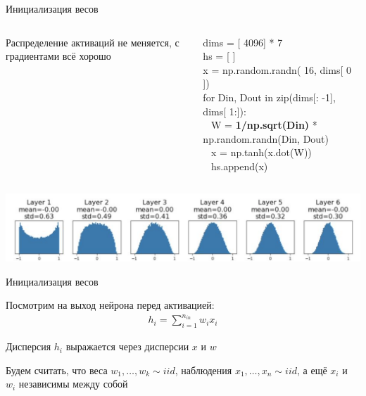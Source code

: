 \documentclass[notes,12pt, aspectratio=169]{beamer}
\newenvironment{wideitemize}{\itemize\addtolength{\itemsep}{10pt}}{\enditemize}
\begin{document}
\begin{frame}{Инициализация весов}
\begin{columns}
	\begin{column}{.3\textwidth}	
			\begin{wideitemize} 
				\item Распределение активаций не меняется,  \alert{с градиентами всё хорошо}
		\end{wideitemize}
	\end{column}
	\begin{column}{.7\textwidth}
		dims = [{\color{green} 4096}] *  {\color{green} 7} \\
		hs = [ ] \\
		x = np.random.randn(  {\color{green} 16}, dims[  {\color{green} 0} ]) \\
		{\color{green} for} Din, Dout {\color{green} in zip}(dims[:  {\color{green} -1}], dims[ {\color{green} 1}:]): \\  
		\mbox{ } \hspace{5mm} W =  {\color{red} \textbf {1/np.sqrt(Din)} } * np.random.randn(Din, Dout) \\
		\mbox{ } \hspace{5mm} x = np.tanh(x.dot(W)) \\
		\mbox{ } \hspace{5mm} hs.append(x)
	\end{column}
\end{columns}
	\begin{center}
		\includegraphics[width=.99\linewidth]{glorot_init_hist.png}
\end{center}
\end{frame}


\begin{frame}{Инициализация весов}
	\begin{wideitemize}
		\item  Посмотрим на выход нейрона перед активацией:
	\begin{equation*}
		\begin{aligned} 
			h_i =  \sum_{i=1}^{n_{in}} w_i x_i 
		\end{aligned}
	\end{equation*}
		\item  Дисперсия $h_i$ выражается через дисперсии $x$ и $w$ 
		\item Будем считать, что веса $w_1, \ldots, w_k \sim iid$,  наблюдения $x_1, \ldots, x_n \sim iid$, а ещё $x_i$ и $w_i$ независимы между собой
	\end{wideitemize}
\end{frame}
\end{document}

